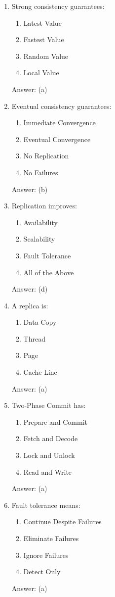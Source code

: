 \begin{enumerate}
\item Strong consistency guarantees:
\begin{enumerate}[label=(\alph*)]
\item Latest Value
\item Fastest Value
\item Random Value
\item Local Value
\end{enumerate}
Answer: (a)

\item Eventual consistency guarantees:
\begin{enumerate}[label=(\alph*)]
\item Immediate Convergence
\item Eventual Convergence
\item No Replication
\item No Failures
\end{enumerate}
Answer: (b)

\item Replication improves:
\begin{enumerate}[label=(\alph*)]
\item Availability
\item Scalability
\item Fault Tolerance
\item All of the Above
\end{enumerate}
Answer: (d)

\item A replica is:
\begin{enumerate}[label=(\alph*)]
\item Data Copy
\item Thread
\item Page
\item Cache Line
\end{enumerate}
Answer: (a)

\item Two-Phase Commit has:
\begin{enumerate}[label=(\alph*)]
\item Prepare and Commit
\item Fetch and Decode
\item Lock and Unlock
\item Read and Write
\end{enumerate}
Answer: (a)

\item Fault tolerance means:
\begin{enumerate}[label=(\alph*)]
\item Continue Despite Failures
\item Eliminate Failures
\item Ignore Failures
\item Detect Only
\end{enumerate}
Answer: (a)


\end{enumerate}
